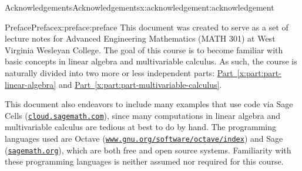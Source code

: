 \documentclass[twoside,10pt,]{book}
\newcommand{\xreffont}{\relax}
\numberwithin{equation}{part}
\begin{document}
\null\clearpage
%
%
\typeout{************************************************}
\typeout{************************************************}
%
\begin{acknowledgement}{Acknowledgements}{}{Acknowledgements}{}{}{x:acknowledgement:acknowledgement}
\end{acknowledgement}
%
%
\typeout{************************************************}
\typeout{************************************************}
%
\begin{preface}{Preface}{}{Preface}{}{}{x:preface:preface}
This document was created to serve as a set of lecture notes for Advanced Engineering Mathematics (MATH 301) at West Virginia Wesleyan College. The goal of this course is to become familiar with basic concepts in linear algebra and multivariable calculus. As such, the course is naturally divided into two more or less independent parts: \hyperref[x:part:part-linear-algebra]{Part~{\xreffont\ref{x:part:part-linear-algebra}}} and \hyperref[x:part:part-multivariable-calculus]{Part~{\xreffont\ref{x:part:part-multivariable-calculus}}}.%
\par
This document also endeavors to include many examples that use code via Sage Cells (\href{https://cloud.sagemath.com}{\nolinkurl{cloud.sagemath.com}}), since many computations in linear algebra and multivariable calculus are tedious at best to do by hand. The programming languages used are Octave (\href{https://www.gnu.org/software/octave/index}{\nolinkurl{www.gnu.org/software/octave/index}}) and Sage (\href{http://sagemath.org}{\nolinkurl{sagemath.org}}), which are both free and open source systems. Familiarity with these programming languages is neither assumed nor required for this course.%
\end{preface}
\setcounter{tocdepth}{0}
\renewcommand*\contentsname{Contents}
\tableofcontents
\mainmatter
%
%
\typeout{************************************************}
\typeout{************************************************}
%
\end{document}
